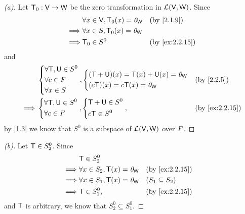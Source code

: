 \begin{proof}[(a)]
  Let \(\mathsf{T}_0 : \mathsf{V} \to \mathsf{W}\) be the zero transformation in \(\mathcal{L}(\mathsf{V}, \mathsf{W})\).
  Since
  \begin{align*}
             & \forall x \in \V, \zT(x) = \zv_{\W} &  & \text{(by \cref{2.1.9})}     \\
    \implies & \forall x \in S, \zT(x) = \zv_{\W}                                    \\
    \implies & \zT \in S^0                         &  & \text{(by \cref{ex:2.2.15})}
  \end{align*}
  and
  \begin{align*}
             & \begin{dcases}
                 \forall \T, \U \in S^0 \\
                 \forall c \in \F       \\
                 \forall x \in S
               \end{dcases}, \begin{dcases}
                               (\T + \U)(x) = \T(x) + \U(x) = \zv_{\W} \\
                               (c \T)(x) = c \T(x) = \zv_{\W}
                             \end{dcases} &  & \text{(by \cref{2.2.5})}                    \\
    \implies & \begin{dcases}
                 \forall \T, \U \in S^0 \\
                 \forall c \in \F
               \end{dcases}, \begin{dcases}
                               \T + \U \in S^0 \\
                               c \T \in S^0
                             \end{dcases},               &  & \text{(by \cref{ex:2.2.15})}
  \end{align*}
  by \cref{1.3} we know that \(S^0\) is a subspace of \(\mathcal{L}(\mathsf{V}, \mathsf{W})\) over \(\mathit{F}\).
\end{proof}

\begin{proof}[(b)]
  Let \(\mathsf{T} \in S_2^0\).
  Since
  \begin{align*}
             & \T \in S_2^0                                                          \\
    \implies & \forall x \in S_2, \T(x) = \zv_{\W} &  & \text{(by \cref{ex:2.2.15})} \\
    \implies & \forall x \in S_1, \T(x) = \zv_{\W} &  & (S_1 \subseteq S_2)          \\
    \implies & \T \in S_1^0,                       &  & \text{(by \cref{ex:2.2.15})}
  \end{align*}
  and \(\mathsf{T}\) is arbitrary, we know that \(S_2^0 \subseteq S_1^0\).
\end{proof}

